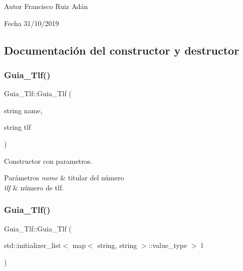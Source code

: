 \begin{DoxyAuthor}{Autor}
Francisco Ruiz Adán 
\end{DoxyAuthor}
\begin{DoxyDate}{Fecha}
31/10/2019 
\end{DoxyDate}


\subsection{Documentación del constructor y destructor}
\mbox{\label{classGuia__Tlf_ae219c6c3261fecbdc5c17ca51b26d036}} 
\subsubsection{\texorpdfstring{Guia\+\_\+\+Tlf()}{Guia\_Tlf()}\hspace{0.1cm}{\footnotesize\ttfamily [1/2]}}
{\footnotesize\ttfamily Guia\+\_\+\+Tlf\+::\+Guia\+\_\+\+Tlf (\begin{DoxyParamCaption}\item[{string}]{name,  }\item[{string}]{tlf }\end{DoxyParamCaption})}



Constructor con parametros. 


\begin{DoxyParams}{Parámetros}
{\em name} & titular del número \\
\hline
{\em tlf} & número de tlf. \\
\hline
\end{DoxyParams}
\mbox{\label{classGuia__Tlf_a49f8340d8bd75335586a88a38507af84}} 
\subsubsection{\texorpdfstring{Guia\+\_\+\+Tlf()}{Guia\_Tlf()}\hspace{0.1cm}{\footnotesize\ttfamily [2/2]}}
{\footnotesize\ttfamily Guia\+\_\+\+Tlf\+::\+Guia\+\_\+\+Tlf (\begin{DoxyParamCaption}\item[{std\+::initializer\+\_\+list$<$ map$<$ string, string $>$\+::value\+\_\+type $>$}]{l }\end{DoxyParamCaption})}



